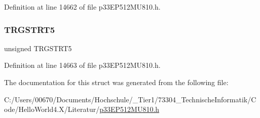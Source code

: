Definition at line 14662 of file p33\+E\+P512\+M\+U810.\+h.

\mbox{\label{structtag_t_r_g_c_o_n3_b_i_t_s_aabeb06bb6258310e01e1a0cd96bf30ca}} 
\subsubsection{\texorpdfstring{T\+R\+G\+S\+T\+R\+T5}{TRGSTRT5}}
{\footnotesize\ttfamily unsigned T\+R\+G\+S\+T\+R\+T5}



Definition at line 14663 of file p33\+E\+P512\+M\+U810.\+h.



The documentation for this struct was generated from the following file\+:\begin{DoxyCompactItemize}
\item 
C\+:/\+Users/00670/\+Documents/\+Hochschule/\+\_\+\+Tier1/73304\+\_\+\+Technische\+Informatik/\+Code/\+Hello\+World4.\+X/\+Literatur/\hyperlink{p33_e_p512_m_u810_8h}{p33\+E\+P512\+M\+U810.\+h}\end{DoxyCompactItemize}
